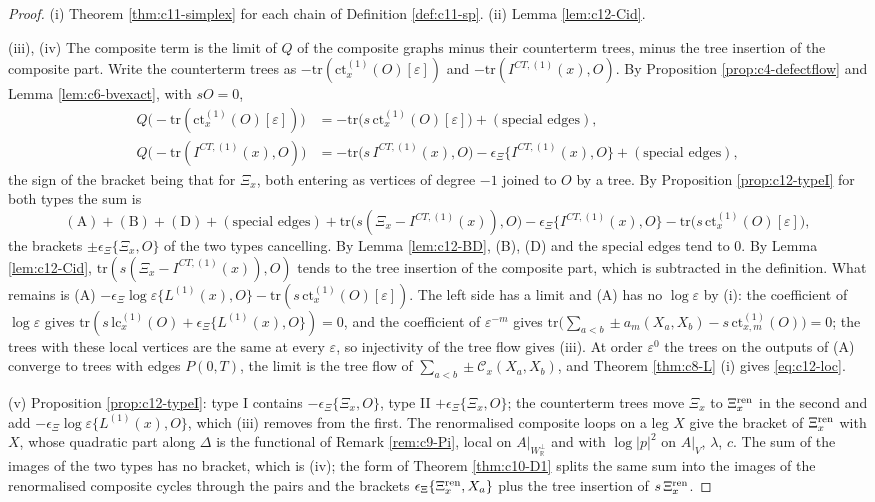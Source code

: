 \begin{proof}
(i) Theorem \ref{thm:c11-simplex} for each chain of Definition \ref{def:c11-sp}. (ii) Lemma \ref{lem:c12-Cid}.

(iii), (iv) The composite term is the limit of $Q$ of the composite graphs minus their counterterm trees, minus the tree insertion of the composite part. Write the counterterm trees as $-\mathrm{tr}(\mathrm{ct}^{(1)}_x(O)[\varepsilon])$ and $-\mathrm{tr}(I^{CT,(1)}(x),O)$. By Proposition \ref{prop:c4-defectflow} and Lemma \ref{lem:c6-bvexact}, with $sO=0$,
\[
\begin{aligned}
Q\big(-\mathrm{tr}(\mathrm{ct}^{(1)}_x(O)[\varepsilon])\big)&=-\mathrm{tr}\big(s\,\mathrm{ct}^{(1)}_x(O)[\varepsilon]\big)+(\text{special edges}),\\
Q\big(-\mathrm{tr}(I^{CT,(1)}(x),O)\big)&=-\mathrm{tr}\big(s\,I^{CT,(1)}(x),O\big)-\epsilon_\Xi\{I^{CT,(1)}(x),O\}+(\text{special edges}),
\end{aligned}
\]
the sign of the bracket being that for $\Xi_x$, both entering as vertices of degree $-1$ joined to $O$ by a tree. By Proposition \ref{prop:c12-typeI} for both types the sum is
\[
(\mathrm A)+(\mathrm B)+(\mathrm D)+(\text{special edges})+\mathrm{tr}\big(s(\Xi_x-I^{CT,(1)}(x)),O\big)-\epsilon_\Xi\{I^{CT,(1)}(x),O\}-\mathrm{tr}\big(s\,\mathrm{ct}^{(1)}_x(O)[\varepsilon]\big),
\]
the brackets $\pm\epsilon_\Xi\{\Xi_x,O\}$ of the two types cancelling. By Lemma \ref{lem:c12-BD}, (B), (D) and the special edges tend to $0$. By Lemma \ref{lem:c12-Cid}, $\mathrm{tr}(s(\Xi_x-I^{CT,(1)}(x)),O)$ tends to the tree insertion of the composite part, which is subtracted in the definition. What remains is (A) $-\epsilon_\Xi\log\varepsilon\{L^{(1)}(x),O\}-\mathrm{tr}(s\,\mathrm{ct}^{(1)}_x(O)[\varepsilon])$. The left side has a limit and (A) has no $\log\varepsilon$ by (i): the coefficient of $\log\varepsilon$ gives $\mathrm{tr}(s\,\mathrm{lc}^{(1)}_x(O)+\epsilon_\Xi\{L^{(1)}(x),O\})=0$, and the coefficient of $\varepsilon^{-m}$ gives $\mathrm{tr}\big(\sum_{a<b}\pm a_m(X_a,X_b)-s\,\mathrm{ct}^{(1)}_{x,m}(O)\big)=0$; the trees with these local vertices are the same at every $\varepsilon$, so injectivity of the tree flow gives (iii). At order $\varepsilon^0$ the trees on the outputs of (A) converge to trees with edges $P(0,T)$, the limit is the tree flow of $\sum_{a<b}\pm\mathcal C_x(X_a,X_b)$, and Theorem \ref{thm:c8-L} (i) gives \eqref{eq:c12-loc}.

(v) Proposition \ref{prop:c12-typeI}: type I contains $-\epsilon_\Xi\{\Xi_x,O\}$, type II $+\epsilon_\Xi\{\Xi_x,O\}$; the counterterm trees move $\Xi_x$ to $\Xi^{\rm ren}_x$ in the second and add $-\epsilon_\Xi\log\varepsilon\{L^{(1)}(x),O\}$, which (iii) removes from the first. The renormalised composite loops on a leg $X$ give the bracket of $\Xi^{\rm ren}_x$ with $X$, whose quadratic part along $\Delta$ is the functional of Remark \ref{rem:c9-Pi}, local on $A|_{W_{\mathbb R}^\perp}$ and with $\log|p|^2$ on $A|_V$, $\lambda$, $c$. The sum of the images of the two types has no bracket, which is (iv); the form of Theorem \ref{thm:c10-D1} splits the same sum into the images of the renormalised composite cycles through the pairs and the brackets $\epsilon_\Xi\{\Xi^{\rm ren}_x,X_a\}$ plus the tree insertion of $s\,\Xi^{\rm ren}_x$.


\end{proof}
